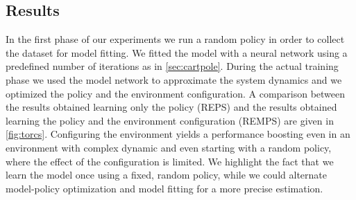 \subsection{Results}
In the first phase of our experiments we run a random policy in order to collect the dataset for model fitting. We fitted the model with a neural network using a predefined number of iterations as in \cref{sec:cartpole}. During the actual training phase we used the model network to approximate the system dynamics and we optimized the policy and the environment configuration.
A comparison between the results obtained learning only the policy (REPS) and the results obtained learning the policy and the environment configuration (REMPS) are given in \cref{fig:torcs}. Configuring the environment yields a performance boosting even in an environment with complex dynamic and even starting with a random policy, where the effect of the configuration is limited. We highlight the fact that we learn the model once using a fixed, random policy, while we could alternate model-policy optimization and model fitting for a more precise estimation. 


